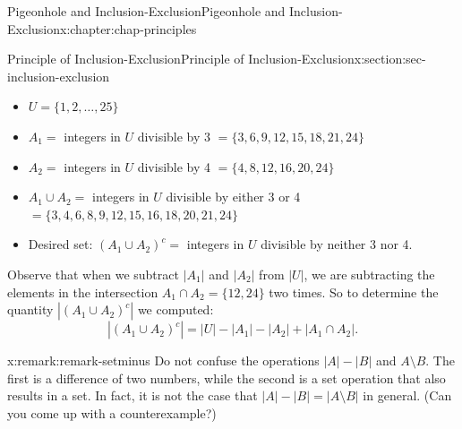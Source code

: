 \documentclass[oneside,10pt,]{book}
\numberwithin{equation}{section}
\begin{document}
\begin{chapterptx}{Pigeonhole and Inclusion-Exclusion}{}{Pigeonhole and Inclusion-Exclusion}{}{}{x:chapter:chap-principles}
\begin{sectionptx}{Principle of Inclusion-Exclusion}{}{Principle of Inclusion-Exclusion}{}{}{x:section:sec-inclusion-exclusion}
\begin{itemize}[label=\textbullet]
\item{}\(\displaystyle U = \{1,2,\ldots,25\}\)%
\item{}\(A_1 = \) integers in \(U\) divisible by 3 \(= \{3,6,9,12,15,18,21,24\}\)%
\item{}\(A_2 = \) integers in \(U\) divisible by 4 \(= \{4,8,12,16,20,24\}\)%
\item{}\(A_1 \cup A_2 = \) integers in \(U\) divisible by either 3 or 4 \(= \{3,4,6,8,9,12,15,16,18,20,21,24\}\)%
\item{}Desired set: \((A_1 \cup A_2)^c = \) integers in \(U\) divisible by neither 3 nor 4.%
\end{itemize}
%
\begin{sidebyside}{1}{0.25}{0.25}{0}%
\begin{sbspanel}{0.5}%
%
\end{sbspanel}%
\end{sidebyside}%
\par
Observe that when we subtract \(|A_1|\) and \(|A_2|\) from \(|U|\), we are subtracting the elements in the intersection \(A_1 \cap A_2 = \{12, 24\}\) two times. So to determine the quantity \(|(A_1 \cup A_2)^c|\) we computed:%
\begin{equation*}
|(A_1 \cup A_2)^c| = |U| - |A_1| - |A_2| + |A_1 \cap A_2|\text{.}
\end{equation*}
%
\begin{remark}{}{x:remark:remark-setminus}%
Do not confuse the operations \(|A| - |B|\) and \(A \setminus B\). The first is a difference of two numbers, while the second is a set operation that also results in a set. In fact, it is not the case that \(|A| - |B| = |A \setminus B|\) in general. (Can you come up with a counterexample?)%

\end{remark}
\end{sectionptx}
\end{chapterptx}
\end{document}
